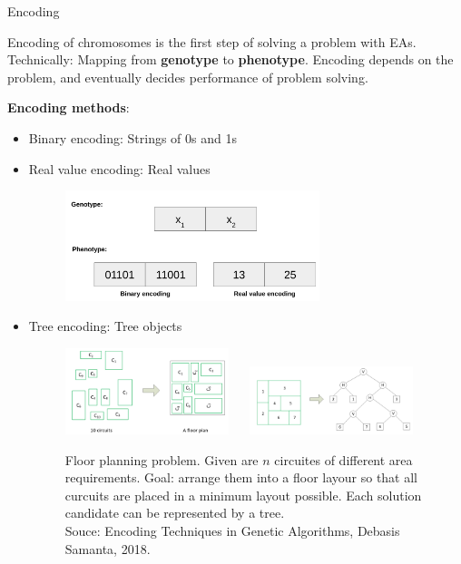 \documentclass[11pt,compress,t,notes=noshow, xcolor=table]{beamer}
\begin{document}
\begin{vbframe}{Encoding}

Encoding of chromosomes is the first step of solving a problem with EAs.  Technically: Mapping from \textbf{genotype} to \textbf{phenotype}. Encoding depends on the problem, and eventually decides performance of problem solving. 

\lz 

\textbf{Encoding methods}: 
\begin{itemize}
  \item Binary encoding: Strings of 0s and 1s 
  \item Real value encoding: Real values 

  \begin{figure}
    \includegraphics[width=0.7\textwidth]{figure_man/encoding_binary_numeric.png}
  \end{figure}
  \item Tree encoding: Tree objects 
  \begin{figure}
    \includegraphics[width=0.45\textwidth]{figure_man/encoding_tree_1.png} ~~ \includegraphics[width=0.45\textwidth]{figure_man/encoding_tree_2.png} \\
    \begin{footnotesize}
      Floor planning problem. Given are $n$ circuites of different area requirements. Goal: arrange them into a floor layour so that all curcuits are placed in a minimum layout possible. Each solution candidate can be represented by a tree. \\ 
      Souce: Encoding Techniques in Genetic Algorithms, Debasis Samanta, 2018. \\
    \end{footnotesize}
  \end{figure}
\end{itemize}

\end{vbframe}
\end{document}
